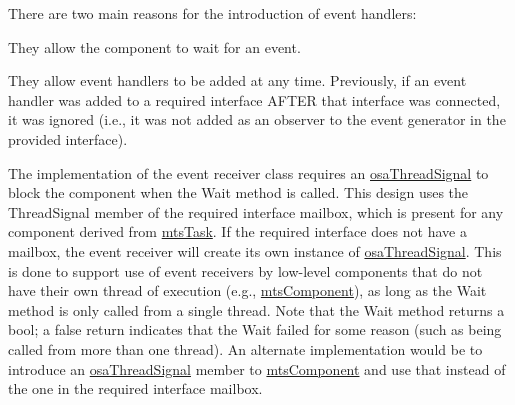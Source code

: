 There are two main reasons for the introduction of event handlers\-:
\begin{DoxyEnumerate}
\item They allow the component to wait for an event.
\item They allow event handlers to be added at any time. Previously, if an event handler was added to a required interface A\-F\-T\-E\-R that interface was connected, it was ignored (i.\-e., it was not added as an observer to the event generator in the provided interface).
\end{DoxyEnumerate}

The implementation of the event receiver class requires an \hyperlink{classosa_thread_signal}{osa\-Thread\-Signal} to block the component when the Wait method is called. This design uses the Thread\-Signal member of the required interface mailbox, which is present for any component derived from \hyperlink{classmts_task}{mts\-Task}. If the required interface does not have a mailbox, the event receiver will create its own instance of \hyperlink{classosa_thread_signal}{osa\-Thread\-Signal}. This is done to support use of event receivers by low-\/level components that do not have their own thread of execution (e.\-g., \hyperlink{classmts_component}{mts\-Component}), as long as the Wait method is only called from a single thread. Note that the Wait method returns a bool; a false return indicates that the Wait failed for some reason (such as being called from more than one thread). An alternate implementation would be to introduce an \hyperlink{classosa_thread_signal}{osa\-Thread\-Signal} member to \hyperlink{classmts_component}{mts\-Component} and use that instead of the one in the required interface mailbox. 

